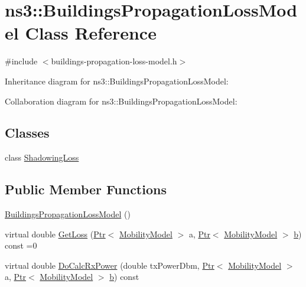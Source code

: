 \hypertarget{classns3_1_1BuildingsPropagationLossModel}{}\section{ns3\+:\+:Buildings\+Propagation\+Loss\+Model Class Reference}
\label{classns3_1_1BuildingsPropagationLossModel}


{\ttfamily \#include $<$buildings-\/propagation-\/loss-\/model.\+h$>$}



Inheritance diagram for ns3\+:\+:Buildings\+Propagation\+Loss\+Model\+:


Collaboration diagram for ns3\+:\+:Buildings\+Propagation\+Loss\+Model\+:
\subsection*{Classes}
\begin{DoxyCompactItemize}
\item 
class \hyperlink{classns3_1_1BuildingsPropagationLossModel_1_1ShadowingLoss}{Shadowing\+Loss}
\end{DoxyCompactItemize}
\subsection*{Public Member Functions}
\begin{DoxyCompactItemize}
\item 
\hyperlink{classns3_1_1BuildingsPropagationLossModel_ab23ac72e775bd5e1d4ee4720e73761c0}{Buildings\+Propagation\+Loss\+Model} ()
\item 
virtual double \hyperlink{classns3_1_1BuildingsPropagationLossModel_a6d3a26e3118fdfd83253387f4360dc55}{Get\+Loss} (\hyperlink{classns3_1_1Ptr}{Ptr}$<$ \hyperlink{classns3_1_1MobilityModel}{Mobility\+Model} $>$ a, \hyperlink{classns3_1_1Ptr}{Ptr}$<$ \hyperlink{classns3_1_1MobilityModel}{Mobility\+Model} $>$ \hyperlink{lte__pathloss_8m_a21ad0bd836b90d08f4cf640b4c298e7c}{b}) const =0
\item 
virtual double \hyperlink{classns3_1_1BuildingsPropagationLossModel_a4037802437c75f0b1707997c8612bdaf}{Do\+Calc\+Rx\+Power} (double tx\+Power\+Dbm, \hyperlink{classns3_1_1Ptr}{Ptr}$<$ \hyperlink{classns3_1_1MobilityModel}{Mobility\+Model} $>$ a, \hyperlink{classns3_1_1Ptr}{Ptr}$<$ \hyperlink{classns3_1_1MobilityModel}{Mobility\+Model} $>$ \hyperlink{lte__pathloss_8m_a21ad0bd836b90d08f4cf640b4c298e7c}{b}) const 
\end{DoxyCompactItemize}
